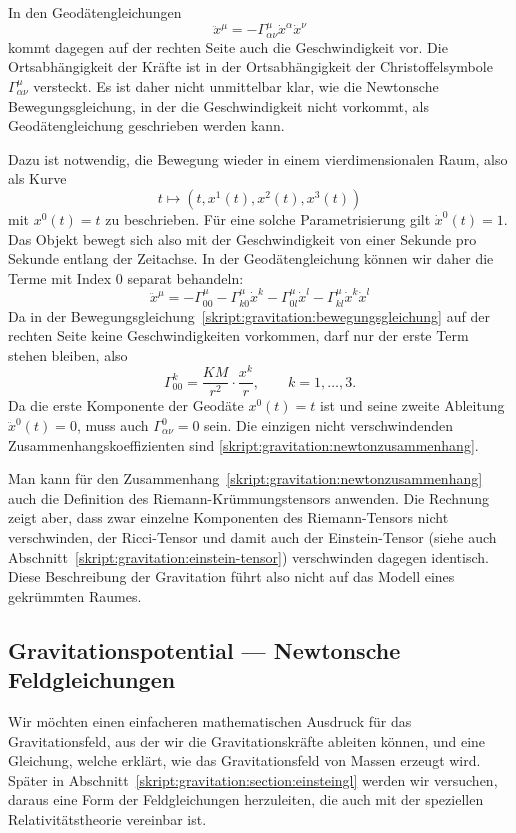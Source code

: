 In den Geodätengleichungen 
\[
\ddot x^\mu = -\Gamma^\mu_{\alpha\nu}\dot x^\alpha\dot x^\nu
\]
kommt dagegen auf der rechten Seite auch die Geschwindigkeit vor.
Die Ortsabhängigkeit der Kräfte ist in der Ortsabhängigkeit der
Christoffelsymbole $\Gamma^\mu_{\alpha\nu}$ versteckt.
Es ist daher nicht unmittelbar klar, wie die Newtonsche Bewegungsgleichung,
in der die Geschwindigkeit nicht vorkommt, als Geodätengleichung geschrieben
werden kann.

Dazu ist notwendig, die Bewegung wieder in einem vierdimensionalen Raum,
also als Kurve
\[
t\mapsto (t,x^1(t),x^2(t),x^3(t))
\]
mit $x^0(t)=t$ zu beschrieben.
Für eine solche Parametrisierung gilt $\dot x^0(t)=1$.
Das Objekt bewegt sich also mit der Geschwindigkeit von einer Sekunde pro
Sekunde entlang der Zeitachse.
In der Geodätengleichung können wir daher die Terme mit Index $0$
separat behandeln:
\[
\ddot x^\mu
=
-\Gamma^\mu_{00}
-\Gamma^\mu_{k0}\dot x^k -\Gamma^\mu_{0l}\dot x^l
- \Gamma^\mu_{kl}\dot x^k\dot x^l
\]
Da in der Bewegungsgleichung~\eqref{skript:gravitation:bewegungsgleichung}
auf der rechten Seite keine Geschwindigkeiten vorkommen, darf nur der
erste Term stehen bleiben, also
\begin{equation}
\Gamma^k_{00} = \frac{KM}{r^2}\cdot \frac{x^k}{r},\qquad k=1,\dots,3.
\label{skript:gravitation:newtonzusammenhang}
\end{equation}
Da die erste Komponente der Geodäte $x^0(t)=t$ ist und seine zweite
Ableitung $\ddot x^0(t)=0$, muss auch $\Gamma^0_{\alpha\nu}=0$ sein.
Die einzigen nicht verschwindenden Zusammenhangskoeffizienten sind
\eqref{skript:gravitation:newtonzusammenhang}.

Man kann für den Zusammenhang~\eqref{skript:gravitation:newtonzusammenhang}
auch die Definition des Riemann-Krümmungstensors anwenden.
Die Rechnung zeigt aber, dass zwar einzelne Komponenten des Riemann-Tensors
nicht verschwinden, der Ricci-Tensor und damit auch der Einstein-Tensor
(siehe auch Abschnitt~\ref{skript:gravitation:einstein-tensor})
verschwinden dagegen identisch.
Diese Beschreibung der Gravitation führt also nicht auf das Modell
eines gekrümmten Raumes.

\subsection{Gravitationspotential --- Newtonsche Feldgleichungen}
Wir möchten einen einfacheren mathematischen Ausdruck für das Gravitationsfeld,
aus der wir die Gravitationskräfte ableiten können, und eine Gleichung,
welche erklärt, wie das Gravitationsfeld von Massen erzeugt wird.
Später in Abschnitt~\ref{skript:gravitation:section:einsteingl}
werden wir versuchen, daraus eine Form der Feldgleichungen herzuleiten,
die auch mit der speziellen Relativitätstheorie vereinbar ist.


